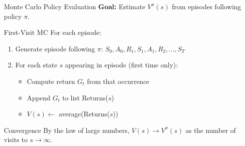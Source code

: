 \documentclass[aspectratio=169]{beamer}
\begin{document}
\begin{frame}{Monte Carlo Policy Evaluation}
  \textbf{Goal:} Estimate $V^\pi(s)$ from episodes following policy $\pi$.

  \vspace{0.5em}

  \begin{examplebox}{First-Visit MC}
    For each episode:
    \begin{enumerate}
      \item Generate episode following $\pi$: $S_0, A_0, R_1, S_1, A_1, R_2, \ldots, S_T$
      \item For each state $s$ appearing in episode (first time only):
      \begin{itemize}
        \item Compute return $G_t$ from that occurrence
        \item Append $G_t$ to list Returns($s$)
        \item $V(s) \leftarrow$ average(Returns($s$))
      \end{itemize}
    \end{enumerate}
  \end{examplebox}

  \vspace{0.5em}

  \begin{theorembox}{Convergence}
    By the law of large numbers, $V(s) \to V^\pi(s)$ as the number of visits to $s \to \infty$.
  \end{theorembox}
\end{frame}
\end{document}
